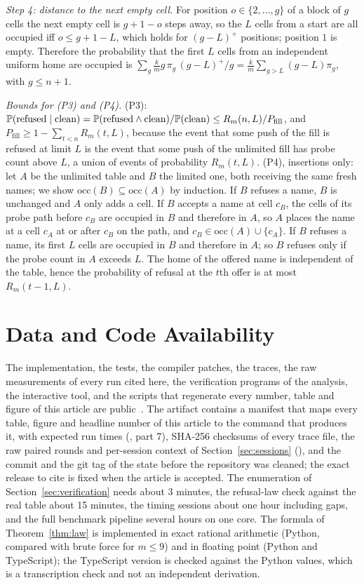 \emph{Step 4: distance to the next empty cell.} For position $o\in\{2,\dots,g\}$ of a block of $g$ cells the next empty cell is $g+1-o$ steps away, so the $L$ cells from a start are all occupied iff $o\le g+1-L$, which holds for $(g-L)^{+}$ positions; position $1$ is empty. Therefore the probability that the first $L$ cells from an independent uniform home are occupied is $\sum_g \tfrac km g\,\pi_g\,(g-L)^{+}/g=\tfrac km\sum_{g>L}(g-L)\pi_g$, with $g\le n+1$.

\emph{Bounds for (P3) and (P4).} (P3): $\mathbb{P}(\text{refused}\mid\text{clean})=\mathbb{P}(\text{refused}\wedge\text{clean})/\mathbb{P}(\text{clean})\le R_m(n,L)/P_{\mathrm{fill}}$, and $P_{\mathrm{fill}}\ge1-\sum_{t<n}R_m(t,L)$, because the event that some push of the fill is refused at limit $L$ is the event that some push of the unlimited fill has probe count above $L$, a union of events of probability $R_m(t,L)$. (P4), insertions only: let $A$ be the unlimited table and $B$ the limited one, both receiving the same fresh names; we show $\mathrm{occ}(B)\subseteq\mathrm{occ}(A)$ by induction. If $B$ refuses a name, $B$ is unchanged and $A$ only adds a cell. If $B$ accepts a name at cell $c_B$, the cells of its probe path before $c_B$ are occupied in $B$ and therefore in $A$, so $A$ places the name at a cell $c_A$ at or after $c_B$ on the path, and $c_B\in\mathrm{occ}(A)\cup\{c_A\}$. If $B$ refuses a name, its first $L$ cells are occupied in $B$ and therefore in $A$; so $B$ refuses only if the probe count in $A$ exceeds $L$. The home of the offered name is independent of the table, hence the probability of refusal at the $t$th offer is at most $R_m(t-1,L)$.

\section*{Data and Code Availability}
The implementation, the tests, the compiler patches, the traces, the raw measurements of every run cited here, the verification programs of the analysis, the interactive tool, and the scripts that regenerate every number, table and figure of this article are public~\cite{strata}. The artifact contains a manifest that maps every table, figure and headline number of this article to the command that produces it, with expected run times (, part 7), SHA-256 checksums of every trace file, the raw paired rounds and per-session context of Section~\ref{sec:sessions} (), and the commit and the git tag  of the state before the repository was cleaned; the exact release to cite is fixed when the article is accepted. The enumeration of Section~\ref{sec:verification} needs about 3 minutes, the refusal-law check against the real table about 15 minutes, the timing sessions about one hour including gaps, and the full benchmark pipeline several hours on one core. The formula of Theorem~\ref{thm:law} is implemented in exact rational arithmetic (Python, compared with brute force for $m\le9$) and in floating point (Python and TypeScript); the TypeScript version is checked against the Python values, which is a transcription check and not an independent derivation.
